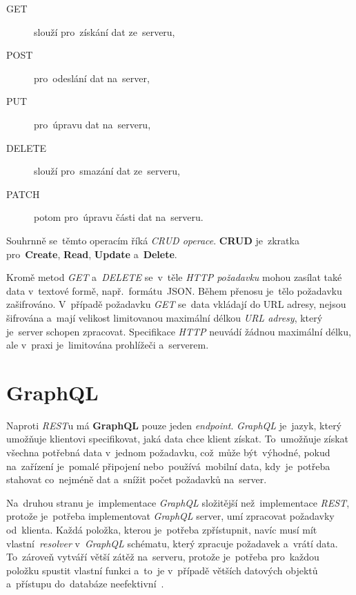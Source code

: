 \documentclass[11pt,a4paper]{report}
\begin{document}
            \begin{description}
                \item[GET] slouží pro~získání dat ze~serveru,
                \item[POST] pro~odeslání dat na~server,
                \item[PUT] pro~úpravu dat na~serveru,
                \item[DELETE] slouží pro~smazání dat ze~serveru,
                \item[PATCH] potom pro~úpravu části dat na~serveru.
            \end{description}

            Souhrnně se~těmto operacím říká \emph{CRUD operace}. \textbf{CRUD} je~zkratka pro~\textbf{Create}, \textbf{Read}, \textbf{Update} a~\textbf{Delete}.

            Kromě metod \emph{GET} a~\emph{DELETE} se~v~těle \emph{HTTP požadavku} mohou zasílat také data v~textové formě, např.~formátu~JSON. Během přenosu je~tělo požadavku zašifrováno. V~případě požadavku \emph{GET} se~data vkládají do URL adresy, nejsou šifrována a~mají velikost limitovanou maximální délkou \emph{URL adresy}, který je~server schopen zpracovat. Specifikace \emph{HTTP} neuvádí žádnou maximální délku, ale v~praxi je~limitována prohlížeči a~serverem. \cite[3.2.1]{ietf-httpbis-messaging-03}

        \section{GraphQL}
            Naproti \emph{REST}u má \textbf{GraphQL} pouze jeden \emph{endpoint}. \emph{GraphQL} je~jazyk, který umožňuje klientovi specifikovat, jaká data chce klient získat. To~umožňuje získat všechna potřebná data v~jednom požadavku, což~může být~výhodné, pokud na~zařízení je~pomalé připojení nebo~používá~mobilní data, kdy~je~potřeba stahovat co~nejméně dat a~snížit počet požadavků na~server.

            Na~druhou stranu je~implementace \emph{GraphQL} složitější než~implementace \emph{REST}, protože je~potřeba implementovat \emph{GraphQL} server, umí zpracovat požadavky od~klienta. Každá položka, kterou je~potřeba zpřístupnit, navíc musí mít vlastní~\emph{resolver} v~\emph{GraphQL} schématu, který zpracuje požadavek a~vrátí data. To~zároveň vytváří větší zátěž na~serveru, protože je~potřeba pro~každou položku spustit vlastní funkci a~to~je v~případě větších datových objektů a~přístupu do~databáze neefektivní~\cite{Herrera:restgraphql, Dorman:webmappingajax}.
\end{document}
